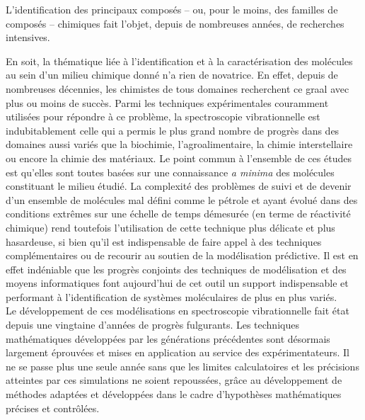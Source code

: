 L'identification des principaux composés -- ou, pour le moins, des familles de composés -- chimiques fait l'objet, depuis de nombreuses années, de recherches intensives.

En soit, la thématique liée à l'identification et à la caractérisation des molécules au sein d'un milieu chimique donné n'a rien de novatrice. En effet, depuis de nombreuses décennies, les chimistes de tous domaines recherchent ce \og graal \fg{} avec plus ou moins de succès. Parmi les techniques expérimentales couramment utilisées pour répondre à ce problème, la spectroscopie vibrationnelle est indubitablement celle qui a permis le plus grand nombre de progrès dans des domaines aussi variés que la biochimie, l'agroalimentaire, la chimie interstellaire ou encore la chimie des matériaux. Le point commun à l'ensemble de ces études est qu'elles sont toutes basées sur une connaissance \textit{a minima} des molécules constituant le milieu étudié. La complexité des problèmes de suivi et de devenir d’un ensemble de molécules mal défini comme le pétrole et ayant évolué dans des conditions extrêmes sur une échelle de temps démesurée (en terme de réactivité chimique) rend toutefois l'utilisation de cette technique plus délicate et plus hasardeuse, si bien qu'il est indispensable de faire appel à des techniques complémentaires ou de recourir au soutien de la modélisation prédictive. Il est en effet indéniable que les progrès conjoints des techniques de modélisation et des moyens informatiques font aujourd'hui de cet outil un support indispensable et performant à l'identification de systèmes moléculaires de plus en plus variés.\\

Le développement de ces modélisations en spectroscopie vibrationnelle fait état depuis une vingtaine d'années de progrès fulgurants. Les techniques mathématiques développées par les générations précédentes sont désormais largement éprouvées et mises en application au service des expérimentateurs.
Il ne se passe plus une seule année sans que les limites calculatoires et les précisions atteintes par ces simulations ne soient repoussées, grâce au développement de méthodes adaptées et développées dans le cadre d'hypothèses mathématiques précises et contrôlées. \\

